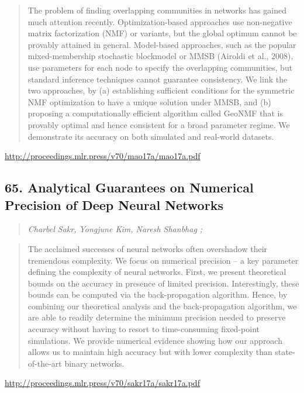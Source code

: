 \documentclass{article}
\begin{document}
\begin{quote}
    The problem of finding overlapping communities in networks has gained much attention recently. Optimization-based approaches use non-negative matrix factorization (NMF) or variants, but the global optimum cannot be provably attained in general. Model-based approaches, such as the popular mixed-membership stochastic blockmodel or MMSB (Airoldi et al., 2008), use parameters for each node to specify the overlapping communities, but standard inference techniques cannot guarantee consistency. We link the two approaches, by (a) establishing sufficient conditions for the symmetric NMF optimization to have a unique solution under MMSB, and (b) proposing a computationally efficient algorithm called GeoNMF that is provably optimal and hence consistent for a broad parameter regime. We demonstrate its accuracy on both simulated and real-world datasets.  \end{quote}

\href{http://proceedings.mlr.press/v70/mao17a/mao17a.pdf}{http://proceedings.mlr.press/v70/mao17a/mao17a.pdf}

\subsection{65. Analytical Guarantees on Numerical Precision of Deep Neural Networks}

\begin{quote}
\footnotesize{\textit{Charbel Sakr, Yongjune Kim, Naresh Shanbhag ;}}
\end{quote}

\begin{quote}
    The acclaimed successes of neural networks often overshadow their tremendous complexity. We focus on numerical precision – a key parameter defining the complexity of neural networks. First, we present theoretical bounds on the accuracy in presence of limited precision. Interestingly, these bounds can be computed via the back-propagation algorithm. Hence, by combining our theoretical analysis and the back-propagation algorithm, we are able to readily determine the minimum precision needed to preserve accuracy without having to resort to time-consuming fixed-point simulations. We provide numerical evidence showing how our approach allows us to maintain high accuracy but with lower complexity than state-of-the-art binary networks.  \end{quote}

\href{http://proceedings.mlr.press/v70/sakr17a/sakr17a.pdf}{http://proceedings.mlr.press/v70/sakr17a/sakr17a.pdf}
\end{document}
